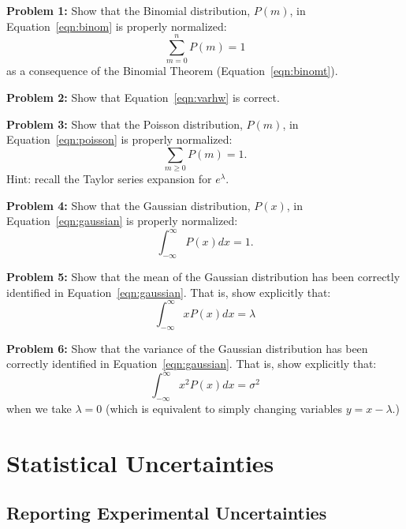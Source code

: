 \documentclass[12pt,oneside]{book}
\begin{document}
\noindent
{\bf Problem 1:} Show that the Binomial distribution, $P(m)$, in Equation~\ref{eqn:binom} is properly normalized:
\begin{displaymath}
\sum_{m=0}^n P(m) = 1
\end{displaymath}
as a consequence of the Binomial Theorem (Equation~\ref{eqn:binomt}).

\vskip 1cm
\noindent
{\bf Problem 2:} Show that Equation~\ref{eqn:varhw} is correct.

\vskip 1cm
\noindent
{\bf Problem 3:} Show that the Poisson distribution, $P(m)$, in Equation~\ref{eqn:poisson} is properly normalized:
\begin{displaymath}
\sum_{m \geq 0} P(m) = 1.
\end{displaymath}
Hint: recall the Taylor series expansion for $e^\lambda$.

\vskip 1cm
\noindent
{\bf Problem 4:} Show that the Gaussian distribution, $P(x)$, in Equation~\ref{eqn:gaussian} is properly normalized:
\begin{displaymath}
\int_{-\infty}^{\infty} P(x) dx = 1.
\end{displaymath}

\vskip 1cm
\noindent
{\bf Problem 5:} Show that the mean of the Gaussian distribution has been correctly identified in Equation~\ref{eqn:gaussian}.  That is, show explicitly that:
\begin{displaymath}
\int_{-\infty}^{\infty} x P(x) dx = \lambda 
\end{displaymath}

\vskip 1cm
\noindent
{\bf Problem 6:} Show that the variance of the Gaussian distribution has been correctly identified in Equation~\ref{eqn:gaussian}.  That is, show explicitly that:
\begin{displaymath}
\int_{-\infty}^{\infty} x^2 P(x) dx = \sigma^2 
\end{displaymath}
when we take $\lambda=0$ (which is equivalent to simply changing variables $y=x-\lambda$.)
   
\newpage

\chapter{Statistical Uncertainties}

\section{Reporting Experimental Uncertainties}
\end{document}
